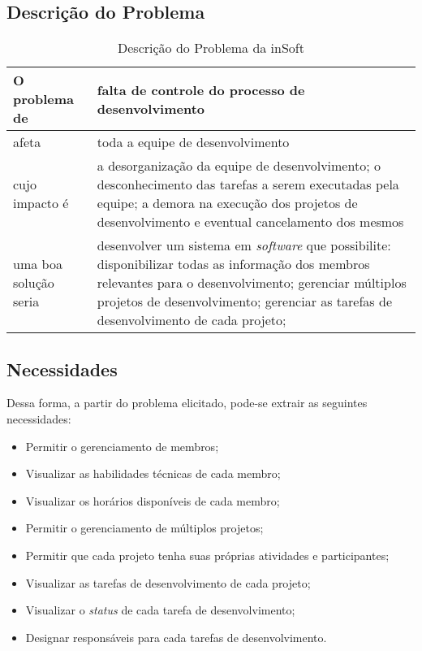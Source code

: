     \subsection{Descrição do Problema}

      \begin{table}[H]
        \centering
        \begin{tabular}{|>{\columncolor[HTML]{C0C0C0}}p{}|p{}|}
          \hline
          O problema de         &   falta de controle do processo de desenvolvimento \\ \hline
          afeta                 &   toda a equipe de desenvolvimento                 \\ \hline
          cujo impacto é        &   a desorganização da equipe de desenvolvimento;
                                    o desconhecimento das tarefas a serem executadas pela equipe;
                                    a demora na execução dos projetos de desenvolvimento e eventual cancelamento dos mesmos                                         \\ \hline
          uma boa solução seria &   desenvolver um sistema em \emph{software} que possibilite:
                                    disponibilizar todas as informação dos membros relevantes para o desenvolvimento;
                                    gerenciar múltiplos projetos de desenvolvimento;
                                    gerenciar as tarefas de desenvolvimento de cada projeto;
                                    \\ \hline
        \end{tabular}
        \caption{Descrição do Problema da inSoft}
      \end{table}

    \subsection{Necessidades}

      Dessa forma, a partir do problema elicitado, pode-se extrair as seguintes necessidades:

        \begin{itemize}
          \item Permitir o gerenciamento de membros;
          \item Visualizar as habilidades técnicas de cada membro;
          \item Visualizar os horários disponíveis de cada membro;
          \item Permitir o gerenciamento de múltiplos projetos;
          \item Permitir que cada projeto tenha suas próprias atividades e participantes;
          \item Visualizar as tarefas de desenvolvimento de cada projeto;
          \item Visualizar o \emph{status} de cada tarefa de desenvolvimento;
          \item Designar responsáveis para cada tarefas de desenvolvimento.
        \end{itemize}


